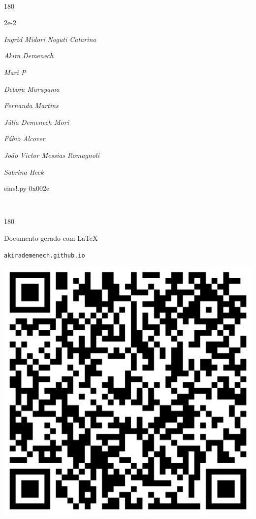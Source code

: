 \documentclass[12pt]{article}
\begin{document}
	\ 
	\vfill
	\begin{turn}{180}	
		\begin{minipage}{\textwidth}
		  	\ttfamily %
			\centering
			{\Huge 2e-2}
		  
			\hfill
		  
			

\textit{\small Ingrid Midori Noguti Catarino}

\textit{\small Akira Demenech}

\textit{\small Mari P}

\textit{\small Debora Maruyama}

\textit{\small Fernanda Martins}

\textit{\small Júlia Demenech Mori}

\textit{\small Fábio Alcover}

\textit{\small João Victor Messias Romagnoli}

\textit{\small Sabrina Heck}

\bigskip

eins!.py
0x002e


		\end{minipage}	
	\end{turn}
	\vfill
	\

\pagebreak

	\begin{turn}{180}	
		\begin{minipage}{\textwidth}		  
		  Documento gerado com \LaTeX			
		  
		  \texttt{akirademenech.github.io}

		  \includegraphics[height=0.3\textheight]{2e-2.pdf}

		\end{minipage}	
	\end{turn}  
		  
\end{document}
